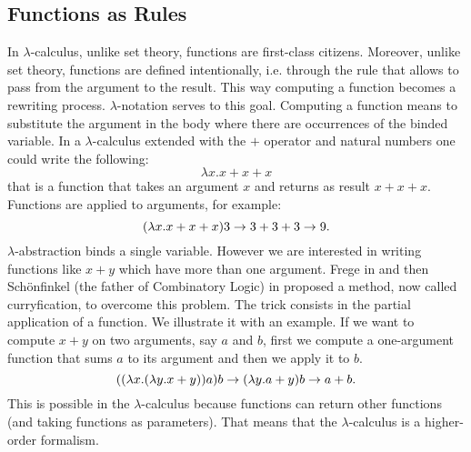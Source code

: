 \subsection{Functions as Rules}
In $\lambda$-calculus, unlike set theory, functions are first-class citizens. Moreover, unlike set theory, functions are defined intentionally, i.e. through the rule that allows to pass from the argument to the result. This way computing a function becomes a rewriting process. $\lambda$-notation serves to this goal. Computing a function means to substitute the argument in the body where there are occurrences of the binded variable. In a $\lambda$-calculus extended with the $+$ operator and natural numbers one could write the following:
$$
\lambda x. x+x+x
$$
that is a function that takes an argument $x$ and returns as result $x+x+x$. Functions are applied to arguments, for example:
$$
(\lambda x. x+x+x)3\rightarrow3+3+3\rightarrow 9.
$$
$\lambda$-abstraction binds a single variable. However we are interested in writing functions like $x+y$ which have more than one argument. Frege in \cite{frege_basic_1893} and then Schönfinkel (the father of Combinatory Logic) in \cite{schonfinkel_uber_1924} proposed a method, now called curryfication, to overcome this problem. The trick consists in the partial application of a function.  We illustrate it with an example. If we want to compute $x+y$ on two arguments, say $a$ and $b$, first we compute a one-argument function that sums $a$ to its argument and then we apply it to $b$.
$$
((\lambda x.(\lambda y.x+y))a)b\rightarrow(\lambda y.a+y)b\rightarrow a+b.
$$
This is possible in the $\lambda$-calculus because functions can return other functions (and taking functions as parameters). That means that the $\lambda$-calculus is a higher-order formalism.
